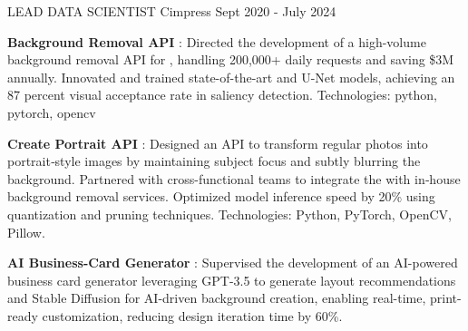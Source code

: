 
\begin{cventries}

    \cventry
    {LEAD DATA SCIENTIST} %
    {Cimpress} %
    {} %
    {Sept 2020 - July 2024} %
    {
      \begin{cvitems} %
      \item{\textbf{Background Removal API} : \newline 
      Directed the development of a high-volume background removal API for ,  
      handling 200,000+ daily requests and saving \$3M annually. \newline 
      Innovated and trained state-of-the-art  and 
      U-Net models, achieving an 87 percent visual acceptance rate in saliency 
      detection. \newline 
      Technologies: python, pytorch, opencv }
      \item{\textbf{Create Portrait API} : \newline
      Designed an API to transform regular photos into portrait‐style images by maintaining subject focus and subtly blurring the background.
      \newline 
      Partnered with cross-functional teams to integrate the  with in‐house background removal services.
      \newline
      Optimized model inference speed by 20\% using quantization and pruning techniques.
      Technologies: Python, PyTorch, OpenCV, Pillow. }
      \item{\textbf{AI Business-Card Generator} : \newline
      Supervised the development of an AI-powered business card generator leveraging GPT-3.5 to generate layout recommendations and Stable Diffusion for AI-driven background creation, enabling real-time, print-ready customization, reducing design iteration time by 60\%. 
}
\end{cvitems}}
\end{cventries}

